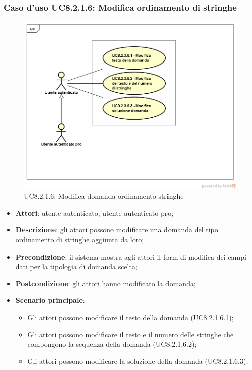 \subsubsection{Caso d’uso UC8.2.1.6: Modifica ordinamento di stringhe}
	\label{UC8.2.1.6}
	\begin{figure}[h]
		\centering
		\includegraphics[scale=0.45,keepaspectratio]{UML/UC8_2_3_6.png}
		\caption{UC8.2.1.6: Modifica domanda ordinamento stringhe}
	\end{figure}
	\FloatBarrier
\begin{itemize}
	\item\textbf{Attori}: utente autenticato, utente autenticato pro;
	\item\textbf{Descrizione}: gli attori possono modificare una domanda del tipo ordinamento di stringhe aggiunta da loro;
	\item\textbf{Precondizione}: il sistema mostra agli attori il form di modifica dei campi dati per la tipologia di domanda scelta; 
	\item \textbf{Postcondizione}: gli attori hanno modificato la domanda;
	\item\textbf{Scenario principale}:
		\begin{itemize}
			\item Gli attori possono modificare il testo della domanda (UC8.2.1.6.1);
			\item Gli attori possono modificare il testo e il numero delle stringhe che compongono la sequenza della domanda (UC8.2.1.6.2);
			\item Gli attori possono modificare la soluzione della domanda (UC8.2.1.6.3); 
		\end{itemize}
\end{itemize}

